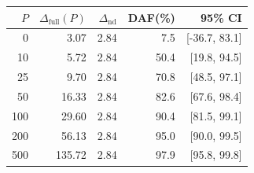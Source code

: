 \begin{tabular}{rrrrr}
\toprule
$P$ & $\Delta_{\text{full}}(P)$ & $\Delta_{\text{nd}}$ & DAF(\%) & 95\% CI \\
\midrule
0 & 3.07 & 2.84 & 7.5 & [-36.7, 83.1] \\
10 & 5.72 & 2.84 & 50.4 & [19.8, 94.5] \\
25 & 9.70 & 2.84 & 70.8 & [48.5, 97.1] \\
50 & 16.33 & 2.84 & 82.6 & [67.6, 98.4] \\
100 & 29.60 & 2.84 & 90.4 & [81.5, 99.1] \\
200 & 56.13 & 2.84 & 95.0 & [90.0, 99.5] \\
500 & 135.72 & 2.84 & 97.9 & [95.8, 99.8] \\
\bottomrule
\end{tabular}